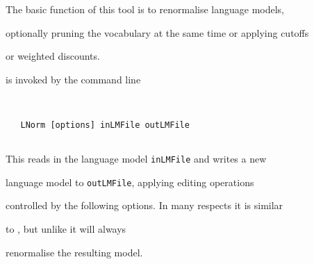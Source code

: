 %




%





\newpage














The basic function of this tool is to renormalise language models,


optionally pruning the vocabulary at the same time or applying cutoffs


or weighted discounts.










 is invoked by the command line


\begin{verbatim}


   LNorm [options] inLMFile outLMFile


\end{verbatim}


This reads in the language model {\tt inLMFile} and writes a new


language model to {\tt outLMFile}, applying editing operations


controlled by the following options.  In many respects it is similar


to , but unlike  it will always


renormalise the resulting model.





